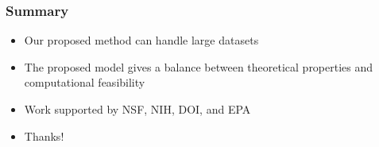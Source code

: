 \documentclass{beamer}
\newcommand{\bit}{\begin{itemize}}
\newcommand{\eit}{\end{itemize}}
\begin{document}
\begin{frame}\frametitle{Summary}
  \bit\setlength\itemsep{\fill}
  \item Our proposed method can handle large datasets
  \item The proposed model gives a balance between theoretical properties and computational feasibility
  \item Work supported by NSF, NIH, DOI, and EPA
  \item Thanks!
  \eit
\end{frame}
\end{document}
